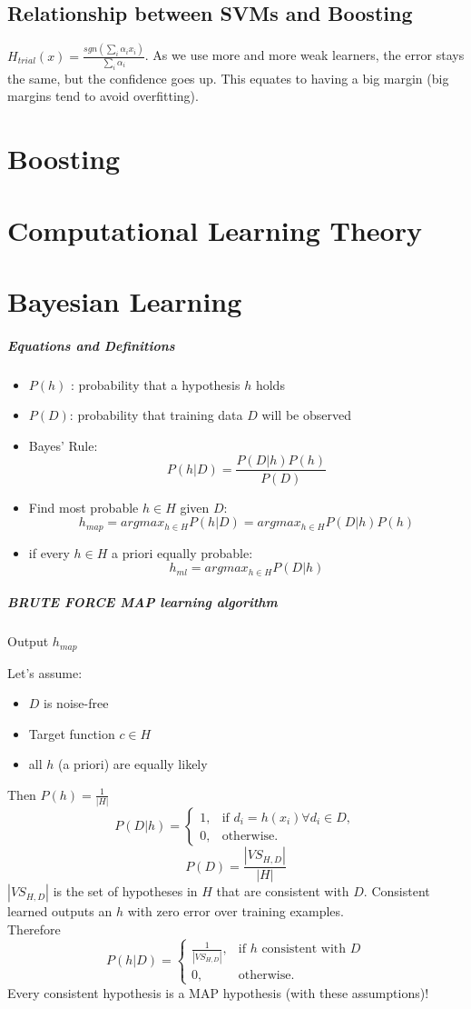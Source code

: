 \documentclass[11pt]{article}
\begin{document}
\subsection{Relationship between SVMs and Boosting}
$H_{trial} (x) = \frac{sgn(\sum_i{\alpha_i x_i})}{\sum_i \alpha_i}$. As we use more and more weak learners, the error stays the same, but the confidence goes up. This equates to having a big margin (big margins tend to avoid overfitting). 


\section{Boosting}

\section{Computational Learning Theory}

\section{Bayesian Learning}
\subparagraph{Equations and Definitions}
\begin{itemize}
\item $P(h)$ : probability that a hypothesis $h$ holds
\item $P(D)$: probability that training data $D$ will be observed
\item Bayes' Rule: $$P(h|D) = \frac{P(D|h)P(h)}{P(D)}$$
\item Find most probable $h \in H$ given $D$: $$h_{map} = argmax_{h \in H} P(h|D) = argmax_{h \in H} P(D|h)P(h)$$
\item if every $h\in H$ a priori equally probable: $$h_{ml} = argmax_{h \in H} P(D|h)$$
\end{itemize}

\subparagraph{BRUTE FORCE MAP learning algorithm}
Output $h_{map}$

Let's assume:
\begin{itemize}
\item $D$ is noise-free
\item Target function $c \in H$
\item all $h$ (a priori) are equally likely
\end{itemize}
Then $P(h) = \frac1{|H|}$\\
$$P(D|h) =
    \begin{cases}
            1, &         \text{if } d_i =h(x_i) \forall d_i \in D,\\
            0, &         \text{otherwise}.
    \end{cases}
$$
$$P(D) = \frac{|VS_{H,D}|}{|H|}$$ $|VS_{H,D}|$ is the set of hypotheses in $H$ that are consistent with $D$. Consistent learned outputs an $h$ with zero error over training examples.\\
Therefore $$P(h|D) = \begin{cases}
            \frac1{|VS_{H,D}|}, &         \text{if $h$ consistent with $D$}\\
            0, &         \text{otherwise}.
    \end{cases}
$$
Every consistent hypothesis is a MAP hypothesis (with these assumptions)!
\end{document}
